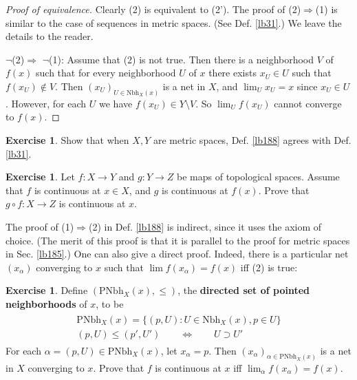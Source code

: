 \documentclass[12pt,b5paper,notitlepage]{article}
\theoremstyle{definition}
\newtheorem{exe}[df]{Exercise}
\theoremstyle{plain}
\newcommand{\Nbh}{\mathrm{Nbh}}
\newcommand{\Pnbh}{\mathrm{PNbh}}
\numberwithin{equation}{section}
\begin{document}
\begin{proof}[Proof of equivalence]
Clearly (2) is equivalent to (2'). The proof of (2)$\Rightarrow$(1) is similar to the case of sequences in metric spaces. (See Def. \ref{lb31}.) We leave the details to the reader.

$\neg$(2)$\Rightarrow$ $\neg$(1): Assume that (2) is not true. Then there is a neighborhood $V$ of $f(x)$ such that for every neighborhood $U$ of $x$ there exists $x_U\in U$ such that $f(x_U)\notin V$. Then $(x_U)_{U\in\Nbh_X(x)}$ is a net in $X$, and $\lim_Ux_U=x$ since $x_U\in U$. However, for each $U$ we have $f(x_U)\in Y\setminus V$. So $\lim_U f(x_U)$ cannot converge to $f(x)$.
\end{proof}

\begin{exe}
Show that when $X,Y$ are metric spaces, Def. \ref{lb188} agrees with Def. \ref{lb31}.
\end{exe}

\begin{exe}\label{lb321}
Let $f:X\rightarrow Y$ and $g:Y\rightarrow Z$ be maps of topological spaces. Assume that $f$ is continuous at $x\in X$, and $g$ is continuous at $f(x)$. Prove that $g\circ f:X\rightarrow Z$ is continuous at $x$.
\end{exe}








The proof of (1)$\Rightarrow$(2) in Def. \ref{lb188} is indirect, since it uses the axiom of choice. (The merit of this proof is that it is parallel to the proof for metric spaces in Sec. \ref{lb185}.) One can also give a direct proof. Indeed, there is a particular net $(x_\alpha)$ converging to $x$ such that  $\lim f(x_\alpha)=f(x)$ iff (2) is true:

\begin{exe}\label{lb198}
Define $(\Pnbh_X(x),\leq)$, \index{PNbh@$\Pnbh_X(x)$} the \textbf{directed set of pointed neighborhoods} of $x$,  to be
\begin{gather}
\begin{gathered}
\Pnbh_X(x)=\big\{(p,U):U\in\Nbh_X(x),p\in U  \big\}\\
(p,U)\leq(p',U')\qquad\Longleftrightarrow\qquad U\supset U'
\end{gathered}
\end{gather}
For each $\alpha=(p,U)\in\Pnbh_X(x)$, let $x_\alpha=p$. Then $(x_\alpha)_{\alpha\in\Pnbh_X(x)}$ is a net in $X$ converging to $x$. Prove that $f$ is continuous at $x$ iff $\lim_\alpha f(x_\alpha)=f(x)$.
\end{exe}
\end{document}
